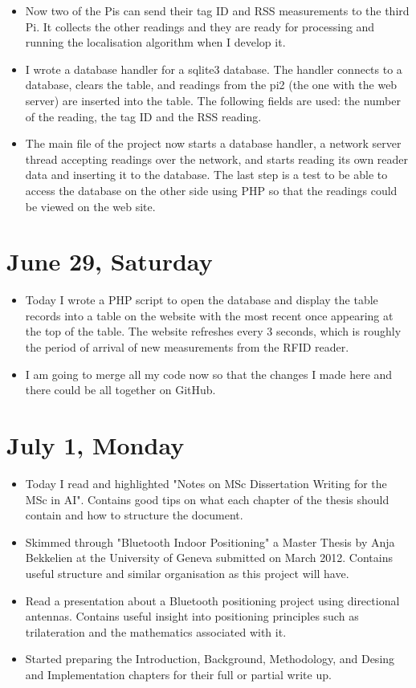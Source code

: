 \documentclass[a4paper,12pt]{article}
\begin{document}
\begin{itemize}
	\item Now two of the Pis can send their tag ID and RSS measurements to the third Pi. It collects the other readings and they are ready for processing and running the localisation algorithm when I develop it.
	\item I wrote a database handler for a sqlite3 database. The handler connects to a database, clears the table, and readings from the pi2 (the one with the web server) are inserted into the table. The following fields are used: the number of the reading, the tag ID and the RSS reading.
	\item The main file of the project now starts a database handler, a network server thread accepting readings over the network, and starts reading its own reader data and inserting it to the database. The last step is a test to be able to access the database on the other side using PHP so that the readings could be viewed on the web site.
\end{itemize}

\section{June 29, Saturday}

\begin{itemize}
	\item Today I wrote a PHP script to open the database and display the table records into a table on the website with the most recent once appearing at the top of the table. The website refreshes every 3 seconds, which is roughly the period of arrival of new measurements from the RFID reader.
	\item I am going to merge all my code now so that the changes I made here and there could be all together on GitHub.
\end{itemize}

\section{July 1, Monday}

\begin{itemize}
	\item Today I read and highlighted "Notes on MSc Dissertation Writing for the MSc in AI". Contains good tips on what each chapter of the thesis should contain and how to structure the document.
	\item Skimmed through "Bluetooth Indoor Positioning" a Master Thesis by Anja Bekkelien at the University of Geneva submitted on March 2012. Contains useful structure and similar organisation as this project will have.
	\item Read a presentation about a Bluetooth positioning project using directional antennas. Contains useful insight into positioning principles such as trilateration and the mathematics associated with it.
	\item Started preparing the Introduction, Background, Methodology, and Desing and Implementation chapters for their full or partial write up.
\end{itemize}
\end{document}
